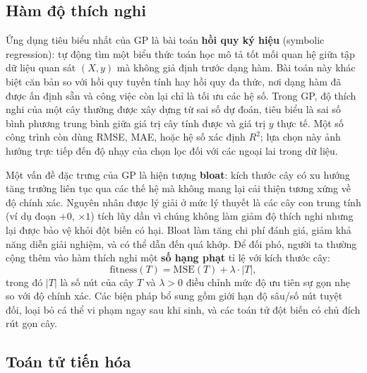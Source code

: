 \subsection*{Hàm độ thích nghi}

Ứng dụng tiêu biểu nhất của GP là bài toán \textbf{hồi quy ký hiệu}
(symbolic regression): tự động tìm một biểu thức toán học mô tả tốt
mối quan hệ giữa tập dữ liệu quan sát $(X, y)$ mà không giả định trước
dạng hàm. Bài toán này khác biệt căn bản so với hồi quy tuyến tính hay
hồi quy đa thức, nơi dạng hàm đã được ấn định sẵn và công việc còn lại
chỉ là tối ưu các hệ số. Trong GP, độ thích nghi của một cây thường
được xây dựng từ sai số dự đoán, tiêu biểu là sai số bình phương trung
bình giữa giá trị cây tính được và giá trị $y$ thực tế. Một số
công trình còn dùng RMSE, MAE, hoặc hệ số xác định $R^2$; lựa chọn
này ảnh hưởng trực tiếp đến độ nhạy của chọn lọc đối với các ngoại lai
trong dữ liệu.

Một vấn đề đặc trưng của GP là hiện tượng \textbf{bloat}: kích thước
cây có xu hướng tăng trưởng liên tục qua các thế hệ mà không mang lại
cải thiện tương xứng về độ chính xác. Nguyên nhân được lý giải ở mức
lý thuyết là các cây con trung tính (ví dụ đoạn $+0$, $\times 1$) tích
lũy dần vì chúng không làm giảm độ thích nghi nhưng lại được bảo vệ
khỏi đột biến có hại. Bloat làm tăng chi phí đánh giá, giảm khả năng
diễn giải nghiệm, và có thể dẫn đến quá khớp. Để đối phó, người ta
thường cộng thêm vào hàm thích nghi một \textbf{số hạng phạt} tỉ lệ với kích thước cây:
\begin{equation}
    \mathrm{fitness}(T) = \mathrm{MSE}(T) + \lambda \cdot |T|,
    \label{eq:parsimony}
\end{equation}
trong đó $|T|$ là số nút của cây $T$ và $\lambda > 0$ điều chỉnh mức
độ ưu tiên sự gọn nhẹ so với độ chính xác. Các biện pháp bổ sung gồm
giới hạn độ sâu/số nút tuyệt đối, loại bỏ cá thể vi phạm ngay sau khi
sinh, và các toán tử đột biến có chủ đích rút gọn cây.

\subsection*{Toán tử tiến hóa}

